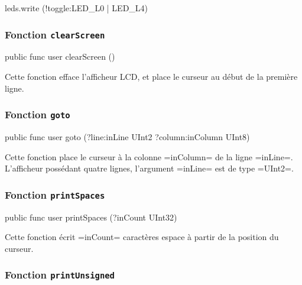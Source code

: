 \begin{OMNIBUS}
  leds.write (!toggle:LED_L0 | LED_L4)
\end{OMNIBUS}








\subsubsection{Fonction \texttt{clearScreen}}

\begin{OMNIBUS}
  public func user clearScreen ()
\end{OMNIBUS}

Cette fonction efface l'afficheur LCD, et place le curseur au début de la première ligne.





\subsubsection{Fonction \texttt{goto}}

\begin{OMNIBUS}
public func user goto (?line:inLine UInt2
                       ?column:inColumn UInt8)
\end{OMNIBUS}

Cette fonction place le curseur à la colonne \omnibus=inColumn= de la ligne \omnibus=inLine=. L'afficheur possédant quatre lignes, l'argument \omnibus=inLine= est de type \omnibus=UInt2=.




\subsubsection{Fonction \texttt{printSpaces}}

\begin{OMNIBUS}
  public func user printSpaces (?inCount UInt32)
\end{OMNIBUS}

Cette fonction écrit \omnibus=inCount= caractères espace à partir de la position du curseur.





\subsubsection{Fonction \texttt{printUnsigned}}

